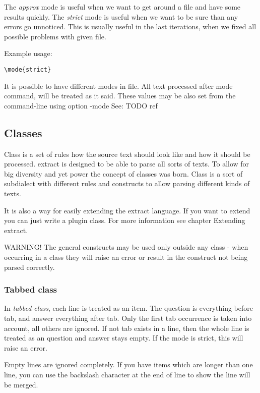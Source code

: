 \documentclass[a4paper,11pt]{article}
\begin{document}
The \textit{approx} mode is useful when we want to get around a file and have
some results quickly.
The \textit{strict} mode is useful when we want to be sure than any
errors go unnoticed. This is usually useful in the last iterations, when we
fixed all possible problems with given file.


Example usage:
\begin{verbatim}
\mode{strict}
\end{verbatim}

It is possible to have different modes in file. All text processed after mode
command, will be treated as it said.
These values may be also set from the command-line using option -mode
See:  TODO ref
\subsection{Classes}
Class is a set of rules how the source text should look like and how it should
be processed.  extract is designed to be able to parse all sorts of texts. To
allow for big diversity and yet power the concept of classes was born.
Class is a sort of subdialect with different rules and constructs to allow
parsing different kinds of texts.

It is also a way for easily extending the extract language. If you want to extend
you can just write a plugin class. For more information see chapter Extending
extract.

WARNING!
The general constructs may be used only outside any class - when occurring in a
class they will raise an error or result in the construct not being parsed
correctly.


\subsubsection{Tabbed class}

In \textit{tabbed class}, each line is treated as an item. The question is everything
before tab, and answer everything after tab.
Only the first tab occurrence is taken into account, all others are ignored.
If not tab exists in a line, then the whole line is treated as an question and
answer stays empty. If the mode is strict, this will raise an error.

Empty lines are ignored completely.
If you have items which are longer than one line, you can use the backslash
character at the end of line to show the line will be merged.
\end{document}
